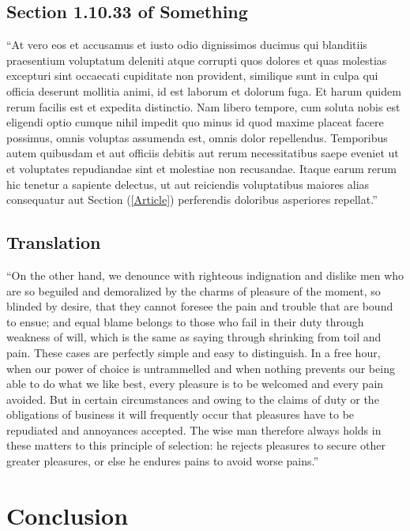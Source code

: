 \documentclass[12pt]{article}
\begin{document}
    \subsection{Section 1.10.33 of Something}
    ``At vero eos et accusamus et iusto odio dignissimos ducimus qui blanditiis praesentium voluptatum deleniti atque corrupti quos dolores et quas molestias excepturi sint occaecati cupiditate non provident, similique sunt in culpa qui officia deserunt mollitia animi, id est laborum et dolorum fuga. Et harum quidem rerum facilis est et expedita distinctio. Nam libero tempore, cum soluta nobis est eligendi optio cumque nihil impedit quo minus id quod maxime placeat facere possimus, omnis voluptas assumenda est, \label{Article}omnis dolor repellendus. Temporibus autem quibusdam et aut officiis debitis aut rerum necessitatibus saepe eveniet ut et voluptates repudiandae sint et molestiae non recusandae. Itaque earum rerum hic tenetur a sapiente delectus, ut aut reiciendis voluptatibus maiores alias consequatur aut Section (\ref{Article}) perferendis doloribus asperiores repellat.''

    \subsection{Translation}
    ``On the other hand, we denounce with righteous indignation and dislike men who are so beguiled and demoralized by the charms of pleasure of the moment, so blinded by desire, that they cannot foresee the pain and trouble that are bound to ensue; and equal blame belongs to those who fail in their duty through weakness of will, which is the same as saying through shrinking from toil and pain. These cases are perfectly simple and easy to distinguish. In a free hour, when our power of choice is untrammelled and when nothing prevents our being able to do what we like best, every pleasure is to be welcomed and every pain avoided. But in certain circumstances and owing to the claims of duty or the obligations of business it will frequently occur that pleasures have to be repudiated and annoyances accepted. The wise man therefore always holds in these matters to this principle of selection: he rejects pleasures to secure other greater pleasures, or else he endures pains to avoid worse pains.''
    \citet{Zhu}
\section{Conclusion}


\end{document}
